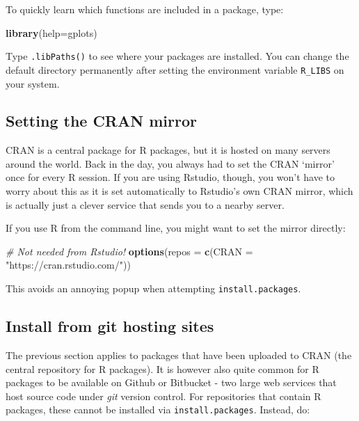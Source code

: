 \documentclass[]{book}
\newenvironment{Shaded}{\begin{snugshade}}{\end{snugshade}}
\newcommand{\CommentTok}[1]{\textcolor[rgb]{0.56,0.35,0.01}{\textit{#1}}}
\newcommand{\DataTypeTok}[1]{\textcolor[rgb]{0.13,0.29,0.53}{#1}}
\newcommand{\KeywordTok}[1]{\textcolor[rgb]{0.13,0.29,0.53}{\textbf{#1}}}
\newcommand{\NormalTok}[1]{#1}
\newcommand{\StringTok}[1]{\textcolor[rgb]{0.31,0.60,0.02}{#1}}
\let\BeginKnitrBlock\begin \let\EndKnitrBlock\end
\begin{document}
To quickly learn which functions are included in a package, type:

\begin{Shaded}
\begin{Highlighting}[]
\KeywordTok{library}\NormalTok{(}\DataTypeTok{help=}\NormalTok{gplots)}
\end{Highlighting}
\end{Shaded}

\BeginKnitrBlock{rmdtry}
Type \texttt{.libPaths()} to see where your packages are installed. You can change the default directory permanently after setting the environment variable \texttt{R\_LIBS} on your system.
\EndKnitrBlock{rmdtry}

\hypertarget{setting-the-cran-mirror}{%
\subsection{Setting the CRAN mirror}\label{setting-the-cran-mirror}}

CRAN is a central package for R packages, but it is hosted on many servers around the world. Back in the day, you always had to set the CRAN `mirror' once for every R session. If you are using Rstudio, though, you won't have to worry about this as it is set automatically to Rstudio's own CRAN mirror, which is actually just a clever service that sends you to a nearby server.

If you use R from the command line, you might want to set the mirror directly:

\begin{Shaded}
\begin{Highlighting}[]
\CommentTok{# Not needed from Rstudio!}
\KeywordTok{options}\NormalTok{(}\DataTypeTok{repos =} \KeywordTok{c}\NormalTok{(}\DataTypeTok{CRAN =} \StringTok{"https://cran.rstudio.com/"}\NormalTok{))}
\end{Highlighting}
\end{Shaded}

This avoids an annoying popup when attempting \texttt{install.packages}.

\hypertarget{install-from-git-hosting-sites}{%
\subsection{Install from git hosting sites}\label{install-from-git-hosting-sites}}

The previous section applies to packages that have been uploaded to CRAN (the central repository for R packages). It is however also quite common for R packages to be available on Github or Bitbucket - two large web services that host source code under \emph{git} version control. For repositories that contain R packages, these cannot be installed via \texttt{install.packages}. Instead, do:
\end{document}
